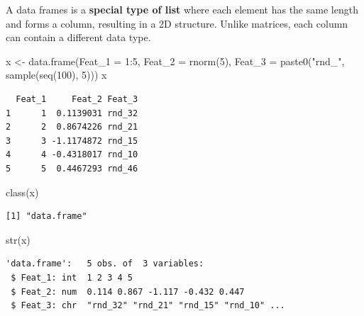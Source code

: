 \documentclass[
]{book}
\makeatletter
\newenvironment{Shaded}{\begin{snugshade}}{\end{snugshade}}
\newcommand{\AttributeTok}[1]{\textcolor[rgb]{0.77,0.63,0.00}{#1}}
\newcommand{\DecValTok}[1]{\textcolor[rgb]{0.00,0.00,0.81}{#1}}
\newcommand{\FunctionTok}[1]{\textcolor[rgb]{0.00,0.00,0.00}{#1}}
\newcommand{\NormalTok}[1]{#1}
\newcommand{\OtherTok}[1]{\textcolor[rgb]{0.56,0.35,0.01}{#1}}
\newcommand{\SpecialCharTok}[1]{\textcolor[rgb]{0.00,0.00,0.00}{#1}}
\newcommand{\StringTok}[1]{\textcolor[rgb]{0.31,0.60,0.02}{#1}}
\newenvironment{kframe}{%
\medskip{}
\setlength{\fboxsep}{.8em}
 \def\at@end@of@kframe{}%
 \ifinner\ifhmode%
  \def\at@end@of@kframe{\end{minipage}}%
  \begin{minipage}{\columnwidth}%
 \fi\fi%
 \def\FrameCommand##1{\hskip\@totalleftmargin \hskip-\fboxsep
 \colorbox{shadecolor}{##1}\hskip-\fboxsep
     \hskip-\linewidth \hskip-\@totalleftmargin \hskip\columnwidth}%
 \MakeFramed {\advance\hsize-\width
   \@totalleftmargin\z@ \linewidth\hsize
   \@setminipage}}%
 {\par\unskip\endMakeFramed%
 \at@end@of@kframe}
\newenvironment{rmdblock}[1]
  {
  \begin{itemize}
  \renewcommand{\labelitemi}{
    \raisebox{-.7\height}[0pt][0pt]{
      {\setkeys{Gin}{width=3em,keepaspectratio}\texttt{[image: images/\#1]}}
    }
  }
  \setlength{\fboxsep}{1em}
  \begin{kframe}
  \item
  }
  {
  \end{kframe}
  \end{itemize}
  }
\newenvironment{note}
  {\begin{rmdblock}{note}}
  {\end{rmdblock}}
\makeatother
\begin{document}
\begin{note}
A data frames is a \textbf{special type of list} where each element has
the same length and forms a column, resulting in a 2D structure. Unlike
matrices, each column can contain a different data type.
\end{note}

\begin{Shaded}
\begin{Highlighting}[]
\NormalTok{x }\OtherTok{\textless{}{-}} \FunctionTok{data.frame}\NormalTok{(}\AttributeTok{Feat\_1 =} \DecValTok{1}\SpecialCharTok{:}\DecValTok{5}\NormalTok{,}
                \AttributeTok{Feat\_2 =} \FunctionTok{rnorm}\NormalTok{(}\DecValTok{5}\NormalTok{),}
                \AttributeTok{Feat\_3 =} \FunctionTok{paste0}\NormalTok{(}\StringTok{"rnd\_"}\NormalTok{, }\FunctionTok{sample}\NormalTok{(}\FunctionTok{seq}\NormalTok{(}\DecValTok{100}\NormalTok{), }\DecValTok{5}\NormalTok{)))}
\NormalTok{x}
\end{Highlighting}
\end{Shaded}

\begin{verbatim}
  Feat_1     Feat_2 Feat_3
1      1  0.1139031 rnd_32
2      2  0.8674226 rnd_21
3      3 -1.1174872 rnd_15
4      4 -0.4318017 rnd_10
5      5  0.4467293 rnd_46
\end{verbatim}

\begin{Shaded}
\begin{Highlighting}[]
\FunctionTok{class}\NormalTok{(x)}
\end{Highlighting}
\end{Shaded}

\begin{verbatim}
[1] "data.frame"
\end{verbatim}

\begin{Shaded}
\begin{Highlighting}[]
\FunctionTok{str}\NormalTok{(x)}
\end{Highlighting}
\end{Shaded}

\begin{verbatim}
'data.frame':   5 obs. of  3 variables:
 $ Feat_1: int  1 2 3 4 5
 $ Feat_2: num  0.114 0.867 -1.117 -0.432 0.447
 $ Feat_3: chr  "rnd_32" "rnd_21" "rnd_15" "rnd_10" ...
\end{verbatim}

\begin{Shaded}
\end{Shaded}
\end{document}

